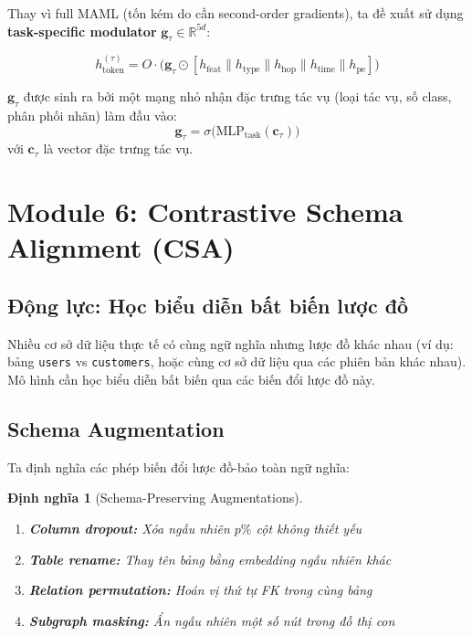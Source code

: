 \documentclass[12pt,a4paper]{article}
\newtheorem{definition}{Định nghĩa}[section]
\begin{document}
Thay vì full MAML (tốn kém do cần second-order gradients), ta đề xuất
sử dụng \textbf{task-specific modulator} $\mathbf{g}_\tau \in \mathbb{R}^{5d}$:

\begin{equation}
  h_\text{token}^{(\tau)} = O \cdot \bigl(\mathbf{g}_\tau \odot
    [h_\text{feat} \| h_\text{type} \| h_\text{hop} \| h_\text{time} \| h_\text{pe}]\bigr)
  \label{eq:modulator}
\end{equation}

$\mathbf{g}_\tau$ được sinh ra bởi một mạng nhỏ nhận đặc trưng tác vụ
(loại tác vụ, số class, phân phối nhãn) làm đầu vào:
\begin{equation}
  \mathbf{g}_\tau = \sigma\bigl(\text{MLP}_\text{task}(\mathbf{c}_\tau)\bigr)
  \label{eq:task_modulator}
\end{equation}
với $\mathbf{c}_\tau$ là vector đặc trưng tác vụ.

\section{Module 6: Contrastive Schema Alignment (CSA)}

\subsection{Động lực: Học biểu diễn bất biến lược đồ}

Nhiều cơ sở dữ liệu thực tế có cùng ngữ nghĩa nhưng lược đồ khác nhau
(ví dụ: bảng \texttt{users} vs \texttt{customers}, hoặc cùng cơ sở dữ liệu
qua các phiên bản khác nhau). Mô hình cần học biểu diễn bất biến qua
các biến đổi lược đồ này.

\subsection{Schema Augmentation}

Ta định nghĩa các phép biến đổi lược đồ-bảo toàn ngữ nghĩa:

\begin{definition}[Schema-Preserving Augmentations]
\begin{enumerate}[nosep]
  \item \textbf{Column dropout:} Xóa ngẫu nhiên $p\%$ cột không thiết yếu
  \item \textbf{Table rename:} Thay tên bảng bằng embedding ngẫu nhiên khác
  \item \textbf{Relation permutation:} Hoán vị thứ tự FK trong cùng bảng
  \item \textbf{Subgraph masking:} Ẩn ngẫu nhiên một số nút trong đồ thị con
\end{enumerate}
\end{definition}
\end{document}
